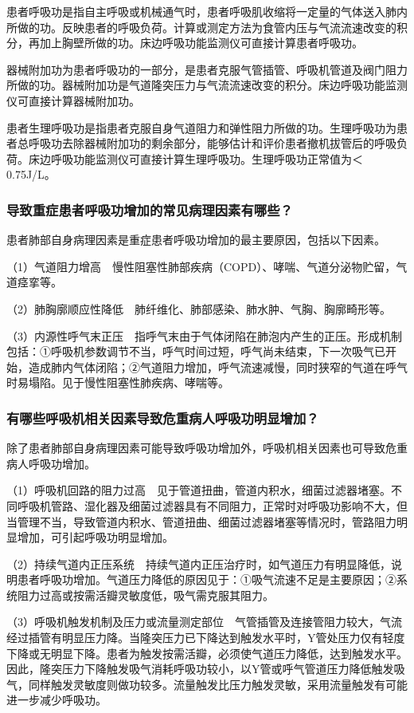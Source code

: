 患者呼吸功是指自主呼吸或机械通气时，患者呼吸肌收缩将一定量的气体送入肺内所做的功。反映患者的呼吸负荷。计算或测定方法为食管内压与气流流速改变的积分，再加上胸壁所做的功。床边呼吸功能监测仪可直接计算患者呼吸功。

器械附加功为患者呼吸功的一部分，是患者克服气管插管、呼吸机管道及阀门阻力所做的功。器械附加功是气道隆突压力与气流流速改变的积分。床边呼吸功能监测仪可直接计算器械附加功。

患者生理呼吸功是指患者克服自身气道阻力和弹性阻力所做的功。生理呼吸功为患者总呼吸功去除器械附加功的剩余部分，能够估计和评价患者撤机拔管后的呼吸负荷。床边呼吸功能监测仪可直接计算生理呼吸功。生理呼吸功正常值为＜0.75J/L。

\subsubsection{导致重症患者呼吸功增加的常见病理因素有哪些？}

患者肺部自身病理因素是重症患者呼吸功增加的最主要原因，包括以下因素。

（1）气道阻力增高　慢性阻塞性肺部疾病（COPD）、哮喘、气道分泌物贮留，气道痉挛等。

（2）肺胸廓顺应性降低　肺纤维化、肺部感染、肺水肿、气胸、胸廓畸形等。

（3）内源性呼气末正压　指呼气末由于气体闭陷在肺泡内产生的正压。形成机制包括：①呼吸机参数调节不当，呼气时间过短，呼气尚未结束，下一次吸气已开始，造成肺内气体闭陷；②气道阻力增加，呼气流速减慢，同时狭窄的气道在呼气时易塌陷。见于慢性阻塞性肺疾病、哮喘等。

\subsubsection{有哪些呼吸机相关因素导致危重病人呼吸功明显增加？}

除了患者肺部自身病理因素可能导致呼吸功增加外，呼吸机相关因素也可导致危重病人呼吸功增加。

（1）呼吸机回路的阻力过高　见于管道扭曲，管道内积水，细菌过滤器堵塞。不同呼吸机管路、湿化器及细菌过滤器具有不同阻力，正常时对呼吸功影响不大，但当管理不当，导致管道内积水、管道扭曲、细菌过滤器堵塞等情况时，管路阻力明显增加，可引起呼吸功明显增加。

（2）持续气道内正压系统　持续气道内正压治疗时，如气道压力有明显降低，说明患者呼吸功增加。气道压力降低的原因见于：①吸气流速不足是主要原因；②系统阻力过高或按需活瓣灵敏度低，吸气需克服其阻力。

（3）呼吸机触发机制及压力或流量测定部位　气管插管及连接管阻力较大，气流经过插管有明显压力降。当隆突压力已下降达到触发水平时，Y管处压力仅有轻度下降或无明显下降。患者为触发按需活瓣，必须使气道压力降低，达到触发水平。因此，隆突压力下降触发吸气消耗呼吸功较小，以Y管或呼气管道压力降低触发吸气，同样触发灵敏度则做功较多。流量触发比压力触发灵敏，采用流量触发有可能进一步减少呼吸功。

